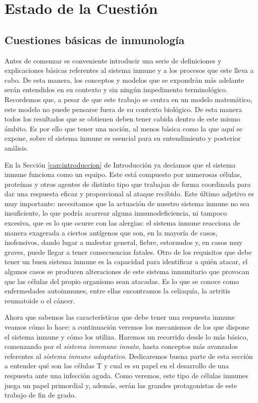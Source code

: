 \chapter{Estado de la Cuestión}
\label{cap:estadoDeLaCuestion}




\section{Cuestiones básicas de inmunología}

Antes de comenzar es conveniente introducir una serie de definiciones y explicaciones básicas referentes al sistema inmune y a los procesos que este lleva a cabo. De esta manera, los conceptos y modelos que se expondrán más adelante serán entendidos en su contexto y sin ningún impedimento terminológico. Recordemos que, a pesar de que este trabajo se centra en un modelo matemático, este  modelo no puede pensarse fuera de su contexto biológico. De esta manera todos los resultados que se obtienen deben tener cabida dentro de este mismo ámbito. Es por ello que tener una noción, al menos básica como la que aquí se expone, sobre el sistema inmune es esencial para su entendimiento y posterior análisis.

En la Sección \ref{cap:introduccion} de Introducción ya decíamos que el sistema inmune funciona como un equipo. Este está compuesto por numerosas células, proteínas y otros agentes de distinto tipo que trabajan de forma coordinada para dar una respuesta eficaz y proporcional al ataque recibido. Este último adjetivo es muy importante: necesitamos que la actuación de nuestro sistema inmune no sea insuficiente, lo que podría acarrear alguna inmunodeficiencia, ni tampoco excesiva, que es lo que ocurre con las alergias: el sistema inmune reacciona de manera exagerada a ciertos antígenos que son, en la mayoría de casos, inofensivos, dando lugar a malestar general, fiebre, estornudos y, en casos muy graves, puede llegar a tener consecuencias fatales. Otro de los requisitos que debe tener un buen sistema inmune es la capacidad para identificar a quién atacar, el algunos casos se producen alteraciones de este sistema inmunitario que provocan que las células del propio organismo sean atacadas. Es lo que se conoce como enfermedades autoinmunes, entre ellas encontramos la celiaquía, la artritis reumatoide o el cáncer.

Ahora que sabemos las características que debe tener una respuesta inmune veamos cómo lo hace: a continuación veremos los mecanismos de los que dispone el sistema inmune y cómo los utiliza. Haremos un recorrido desde lo más básico, comenzando por el \textit{sistema inmmune innato}, hasta conceptos más avanzados referentes al \textit{sistema inmune adaptativo}. Dedicaremos buena parte de esta sección a entender qué son las células T y cual es su papel en el desarrollo de una respuesta ante una infección aguda. Como veremos, este tipo de células inmunes juega un papel primordial y, además, serán las grandes protagonistas de este trabajo de fin de grado.  

